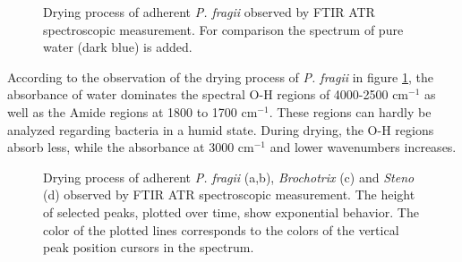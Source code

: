 \documentclass[foods,article,submit,moreauthors,pdftex]{Definitions/mdpi}
\begin{document}
\begin{figure}[ht]
  \caption{Drying process of adherent \textit{P. fragii }observed by FTIR ATR spectroscopic measurement. For comparison the spectrum of pure water (dark blue) is added. }
 \label{fig:dryPureWater}
\end{figure}
According to the observation of the drying process of  \textit{P. fragii } in figure \ref{fig:dryPureWater}, the absorbance of water dominates the spectral O-H regions of 4000-2500 cm$^{-1}$ as well as the Amide regions at 1800 to 1700 cm$^{-1}$. These regions can hardly be analyzed regarding bacteria in a humid state. During drying, the O-H regions absorb less, while the absorbance at 3000 cm$^{-1}$ and lower wavenumbers increases. 


\begin{figure}[ht]
  \caption{Drying process of adherent \textit{P. fragii }(a,b), \textit{Brochotrix} (c) and \textit{Steno} (d) observed by FTIR ATR spectroscopic measurement. The height of selected peaks, plotted over time, show exponential behavior. The color of the plotted lines corresponds to the colors of the vertical peak position cursors in the spectrum.}
 \label{fig:dryingprocess}
\end{figure}
\end{document}

